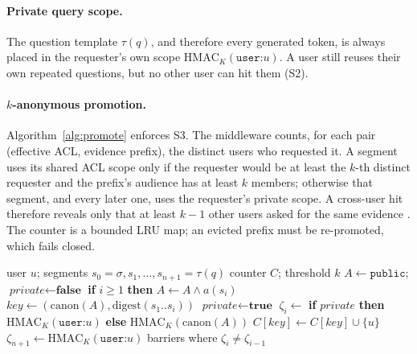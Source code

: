 \documentclass[11pt]{article}
\newcommand{\aud}{\mathrm{Aud}}
\begin{document}
\paragraph{Private query scope.} The question template $\tau(q)$, and therefore every generated token, is always placed in the requester's own scope $\mathrm{HMAC}_K(\texttt{user:}u)$. A user still reuses their own repeated questions, but no other user can hit them (S2).

\paragraph{$k$-anonymous promotion.} Algorithm~\ref{alg:promote} enforces S3. The middleware counts, for each pair (effective ACL, evidence prefix), the distinct users who requested it. A segment uses its shared ACL scope only if the requester would be at least the $k$-th distinct requester and the prefix's audience has at least $k$ members; otherwise that segment, and every later one, uses the requester's private scope. A cross-user hit therefore reveals only that at least $k{-}1$ other users asked for the same evidence \citep{sweeney2002kanon}. The counter is a bounded LRU map; an evicted prefix must be re-promoted, which fails closed.

\begin{algorithm}[t]
\caption{Scope plan with $k$-anonymous promotion}
\label{alg:promote}
\small
\begin{algorithmic}[1]
\Require user $u$; segments $s_0{=}\sigma,s_1,\dots,s_{n+1}{=}\tau(q)$
\Require counter $C$; threshold $k$
\State $A\gets\texttt{public}$;\; $\textit{private}\gets\textbf{false}$
  \State \textbf{if} $i\ge1$ \textbf{then} $A\gets A\wedge a(s_i)$
  \State $key\gets(\mathrm{canon}(A), \mathrm{digest}(s_1..s_i))$
  \If{$\neg\textit{private}$ \textbf{and} ($|\aud(A)|<k$ \textbf{or} $|C[key]\cup\{u\}|<k$)}
     \State $\textit{private}\gets\textbf{true}$
  \EndIf
  \State $\zeta_i\gets$ \textbf{if} $\textit{private}$ \textbf{then} $\mathrm{HMAC}_K(\texttt{user:}u)$ \textbf{else} $\mathrm{HMAC}_K(\mathrm{canon}(A))$
  \State $C[key]\gets C[key]\cup\{u\}$
\EndFor
\State $\zeta_{n+1}\gets\mathrm{HMAC}_K(\texttt{user:}u)$ 
\State \Return barriers where $\zeta_i\ne\zeta_{i-1}$
\end{algorithmic}
\end{algorithm}
\end{document}
